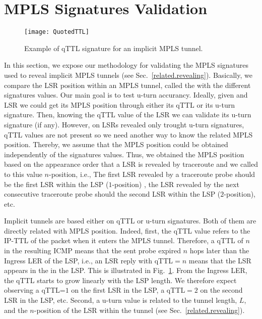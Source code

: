 \section{MPLS Signatures Validation}\label{validation}
\begin{figure}[!t]
  \begin{center}
    \texttt{[image: QuotedTTL]}
  \end{center}
  \caption{Example of qTTL signature for an implicit MPLS tunnel.}
  \label{validation.qTTLFig}
\end{figure}

In this section, we expose our methodology for validating the MPLS
signatures used to reveal implicit MPLS tunnels (see Sec.~\ref{related.revealing}).
Basically, we compare the LSR position within an MPLS tunnel, called the
 with the different signatures values. Our main goal is to test 
u-turn accurancy. Ideally, given and LSR we could get its MPLS position through 
either its qTTL or its u-turn signature. Then, knowing the qTTL value of the LSR we can validate its u-turn signature (if any). However, on LSRs revealed only trought u-turn signatures,
qTTL values are not present so we need another way to know the related MPLS position. Thereby, we assume that the MPLS position
could be obtained independently of the signatures values. Thus, we obtained the MPLS position based on the appearance order that a LSR is 
revealed by traceroute and we called to this value $n$-position, i.e., The first LSR revealed by a traceroute probe should be
the first LSR within the LSP ($1$-position) , the LSR revealed by the next consecutive traceroute probe should
the second LSR within the LSP ($2$-position), etc. 

Implicit tunnels are based either on qTTL or u-turn signatures. Both of them are
directly related with MPLS position.  Indeed, first, the qTTL value refers to
the IP-TTL of the \echorequest packet when it enters the MPLS tunnel. 
Therefore, a qTTL of $n$ in the resulting ICMP \ttlexceeded means that the sent
probe expired $n$ hops later than the Ingress LER of the LSP, i.e., an LSR reply
with qTTL$=n$ means that the LSR appears in the  in the LSP. 
This is illustrated in Fig.~\ref{validation.qTTLFig}.  From the Ingress LER, the
qTTL starts to grow linearly with the LSP length.  We therefore expect observing
a qTTL=$1$ on the first LSR in the LSP, a qTTL$=2$ on the second LSR in the LSP,
etc.  Second, a u-turn value is related to the tunnel length, $L$, and the
$n$-position of the LSR within the tunnel (see Sec.~\ref{related.revealing}).

